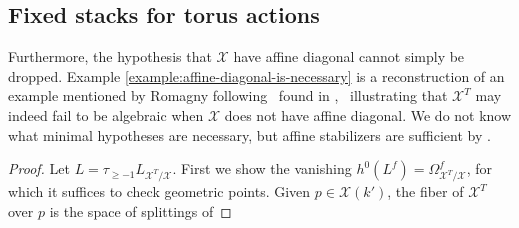 \subsection{Fixed stacks for torus actions}\label{rl-000C}


Furthermore, the hypothesis that \(\mathcal X\) have affine diagonal cannot simply be dropped. Example \ref{example:affine-diagonal-is-necessary} is a reconstruction of an example mentioned by Romagny following~\cite[Theorem 1.2.2]{romagny_AlgebraicitySmoothnessFixed2022} found in \cite[Exp. IX, Rem. 7.4]{SGA3-2},~ illustrating that \(\mathcal X^T\) may indeed fail to be algebraic when \(\mathcal X\) does not have affine diagonal. We do not know what minimal hypotheses are necessary, but affine stabilizers are sufficient by \cite[Theorem A.20]{aranha-khan-latyntsev-etal_VirtualLocalizationRevisited2025}.

\begin{proof}
  Let \(L = \tau_{\geq -1}L_{\mathcal X^T/\mathcal X}\). First we show the vanishing \(h^0(L^f) = \Omega^f_{\mathcal X^T/\mathcal X}\), for which it suffices to check geometric points. Given \(p\in \mathcal X(k')\), the fiber of \(\mathcal X^T\) over \(p\) is the space of splittings of 
\end{proof}
